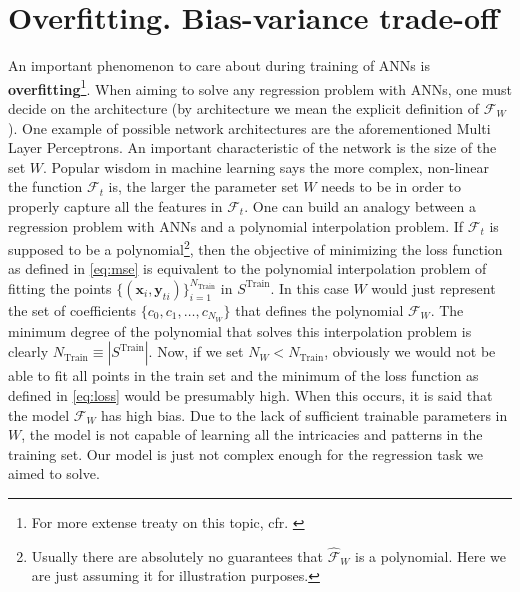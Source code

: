 \section{Overfitting. Bias-variance trade-off}
\indent An important phenomenon to care about during training of ANNs is \textbf{overfitting}\footnote{For more extense treaty on this topic, cfr. \cite{Marsland2015Machine}}. When aiming to solve any regression problem with ANNs, one must decide on the architecture (by architecture we mean the explicit definition of $\mathcal{{F}}_W$). One example of possible network architectures are the aforementioned Multi Layer Perceptrons. An important characteristic of the network is the size of the set $W$. Popular wisdom in machine learning says the more complex, non-linear the function $\mathcal{F}_t$ is, the larger the parameter set $W$ needs to be in order to properly capture all the features in $\mathcal{F}_t$. One can build an analogy between a regression problem with ANNs and a polynomial interpolation problem. If $\mathcal{F}_t$ is supposed to be a polynomial\footnote{Usually there are absolutely no guarantees that $\mathcal{\hat{F}}_W$ is a polynomial. Here we are just assuming it for illustration purposes.}, then the objective of minimizing the loss function as defined in \cref{eq:mse} is equivalent to the polynomial interpolation problem of fitting the points $\{(\mathbf{x}_i,\mathbf{y}_{ti})\}_{i=1}^{N_{\text{Train}}}$ in $S^\text{Train}$. In this case $W$ would just represent the set of coefficients $\{c_0,c_1,\ldots,c_{N_W}\}$ that defines the polynomial $\mathcal{{F}}_W$. The minimum degree of the polynomial that solves this interpolation problem is clearly $N_{\text{Train}}\equiv\left|S^{\text{Train}}\right|$. Now, if we set $N_W<N_{\text{Train}}$, obviously we would not be able to fit all points in the train set and the minimum of the loss function as defined in \cref{eq:loss} would be presumably high. When this occurs, it is said that the model $\mathcal{{F}}_W$ has high bias. Due to the lack of sufficient trainable parameters in $W$, the model is not capable of learning all the intricacies and patterns in the training set. Our model is just not complex enough for the regression task we aimed to solve.\\
%
